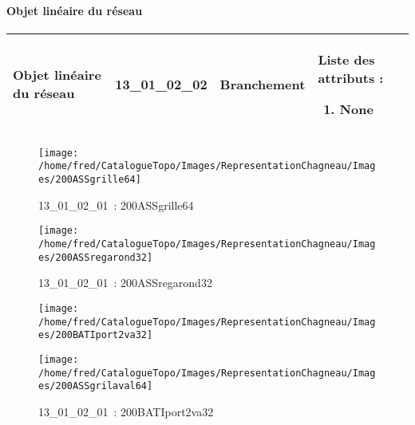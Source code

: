 \documentclass[12pt,titlepage,oneside]{book}
\begin{document}
\paragraph{Objet linéaire du réseau}
\noindent
\vspace{\baselineskip}

\renewcommand{\arraystretch}{1.2}
\begin{supertabular}{|p{10cm}|c|p{13cm}|p{12cm}|}
 Objet linéaire du réseau & 13\_01\_02\_02 & Branchement & Liste des attributs :
\begin{enumerate}
  \item None\end{enumerate}
\\
\hline
\end{supertabular}
\begin{figure}[h!]
  \hfill         %
  \begin{minipage}[t]{3cm}
    \begin{center}
      \texttt{[image: /home/fred/CatalogueTopo/Images/RepresentationChagneau/Images/200ASSgrille64]}
      \caption[~13\_01\_02\_01]{\small{13\_01\_02\_01~:} \tiny{200ASSgrille64}}\label{200ASSgrille64}
    \end{center}
  \end{minipage}
  \begin{minipage}[t]{3cm}
    \begin{center}
      \texttt{[image: /home/fred/CatalogueTopo/Images/RepresentationChagneau/Images/200ASSregarond32]}
      \caption[~13\_01\_02\_01]{\small{13\_01\_02\_01~:} \tiny{200ASSregarond32}}\label{200ASSregarond32}
    \end{center}
  \end{minipage}
  \begin{minipage}[t]{3cm}
    \begin{center}
      \texttt{[image: /home/fred/CatalogueTopo/Images/RepresentationChagneau/Images/200BATIport2va32]}
      \caption[~13\_01\_02\_01]{\small{13\_01\_02\_01~:} \tiny{200BATIport2va32}}\label{200BATIport2va32}
    \end{center}
  \end{minipage}
  \begin{minipage}[t]{3cm}
    \begin{center}
      \texttt{[image: /home/fred/CatalogueTopo/Images/RepresentationChagneau/Images/200ASSgrilaval64]}

\end{center}
\end{minipage}
\end{figure}
\end{document}
